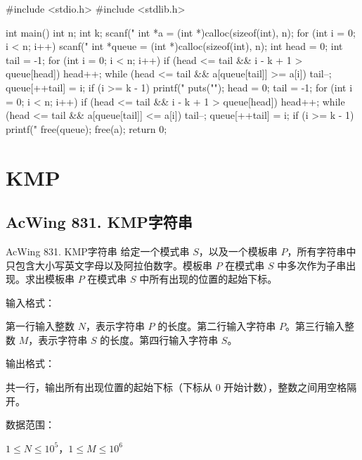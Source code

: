 \begin{mycpptwocol}
    #include <stdio.h>
    #include <stdlib.h>

    int main() {
        int n;
        int k;
        scanf("%
        int *a = (int *)calloc(sizeof(int), n);
        for (int i = 0; i < n; i++) {
            scanf("%
        }
        int *queue = (int *)calloc(sizeof(int), n);
        int head = 0;
        int tail = -1;
        for (int i = 0; i < n; i++) {
            if (head <= tail && i - k + 1 > queue[head]) {
                head++;
            }
            while (head <= tail && a[queue[tail]] >= a[i]) {
                tail--;
            }
            queue[++tail] = i;
            if (i >= k - 1) {
                printf("%
            }
        }
        puts("");
        head = 0;
        tail = -1;
        for (int i = 0; i < n; i++) {
            if (head <= tail && i - k + 1 > queue[head]) {
                head++;
            }
            while (head <= tail && a[queue[tail]] <= a[i]) {
                tail--;
            }
            queue[++tail] = i;
            if (i >= k - 1) {
                printf("%
            }
        }
        free(queue);
        free(a);
        return 0;
    }
\end{mycpptwocol}


\section{KMP}

\subsection{AcWing 831. KMP字符串}

\begin{titledbox}{AcWing 831. KMP字符串}
    给定一个模式串 $S$，以及一个模板串 $P$，所有字符串中只包含大小写英文字母以及阿拉伯数字。模板串 $P$ 在模式串 $S$ 中多次作为子串出现。求出模板串 $P$ 在模式串 $S$ 中所有出现的位置的起始下标。

    输入格式：

    第一行输入整数 $N$，表示字符串 $P$ 的长度。第二行输入字符串 $P$。第三行输入整数 $M$，表示字符串 $S$ 的长度。第四行输入字符串 $S$。

    输出格式：

    共一行，输出所有出现位置的起始下标（下标从 $0$ 开始计数），整数之间用空格隔开。

    数据范围：

    $1 \le N \le 10^5$，$1 \le M \le 10^6$

    \begin{inputblock}
         \\
         \\
         \\
    \end{inputblock}
    \begin{outputblock}
    \end{outputblock}
\end{titledbox}

